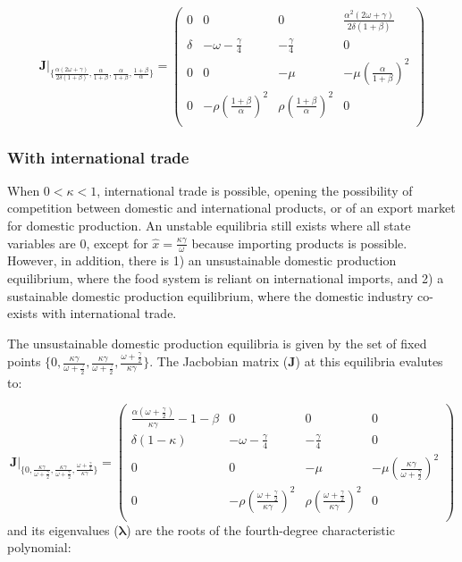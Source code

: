 \documentclass[12pt]{article}
\begin{document}
\begin{equation}
  \boldsymbol{J} \Big |_{\{\frac{\alpha(2\omega + \gamma)}{2 \delta (1 + \beta)}, \frac{\alpha}{1 + \beta}, \frac{\alpha}{1 + \beta}, \frac{1 + \beta}{\alpha}\}} =
  \begin{pmatrix}
    0   &    0     &  0 &  \frac{\alpha^2(2 \omega + \gamma)}{2 \delta (1 + \beta)} \\
    \delta & - \omega - \frac{\gamma}{4}  &  - \frac{\gamma}{4} & 0 \\
    0      &           0            & -\mu     & - \mu (\frac{\alpha}{1+\beta})^2\\
    0      &   - \rho (\frac{1 + \beta}{\alpha})^2    & \rho (\frac{1+\beta}{\alpha})^2 & 0 \\
  \end{pmatrix}
\end{equation}
\fi

\subsubsection{With international trade}
When $0 < \kappa < 1$, international trade is possible, opening the possibility of competition between domestic and international products, or of an export market for domestic production. An unstable equilibria still exists where all state variables are 0, except for $\hat{x} = \frac{\kappa \gamma}{\omega}$ because importing products is possible. However, in addition, there is 1) an unsustainable domestic production equilibrium, where the food system is reliant on international imports, and 2) a sustainable domestic production equilibrium, where the domestic industry co-exists with international trade.

The unsustainable domestic production equilibria is given by the set of fixed points $\{0, \frac{\kappa \gamma}{\omega + \frac{\gamma}{2}}, \frac{\kappa \gamma}{\omega + \frac{\gamma}{2}}, \frac{\omega + \frac{\gamma}{2}}{\kappa \gamma}\}$. The Jacbobian matrix ($\boldsymbol{J}$) at this equilibria evalutes to:

\begin{equation}
  \boldsymbol{J} \Big |_{\big \{0, \frac{\kappa \gamma}{\omega + \frac{\gamma}{2}}, \frac{\kappa \gamma}{\omega + \frac{\gamma}{2}}, \frac{\omega + \frac{\gamma}{2}}{\kappa \gamma}\big \}} =
  \begin{pmatrix}
    \frac{\alpha(\omega + \frac{\gamma}{2})}{\kappa \gamma} - 1 - \beta   &    0     &     0    &  0 \\
    \delta (1 - \kappa) & - \omega - \frac{\gamma}{4}  &  - \frac{\gamma}{4} & 0 \\
    0      &           0            & -\mu     & - \mu (\frac{\kappa \gamma}{\omega + \frac{\gamma}{2}})^2\\
    0      &   - \rho (\frac{\omega + \frac{\gamma}{2}}{\kappa \gamma})^2    & \rho (\frac{\omega + \frac{\gamma}{2}}{\kappa \gamma})^2 & 0 \\
  \end{pmatrix}
\end{equation}
%
and its eigenvalues ($\boldsymbol{\lambda}$) are the roots of the fourth-degree characteristic polynomial:
\end{document}
